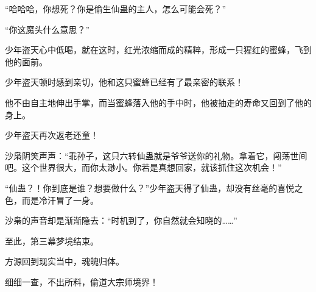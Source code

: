 \begin{this_body}
“哈哈哈，你想死？你是偷生仙蛊的主人，怎么可能会死？”

“你这魔头什么意思？”

少年盗天心中低喝，就在这时，红光浓缩而成的精粹，形成一只猩红的蜜蜂，飞到他的面前。

少年盗天顿时感到亲切，他和这只蜜蜂已经有了最亲密的联系！

他不由自主地伸出手掌，而当蜜蜂落入他的手中时，他被抽走的寿命又回到了他的身上。

少年盗天再次返老还童！

沙枭阴笑声声：“乖孙子，这只六转仙蛊就是爷爷送你的礼物。拿着它，闯荡世间吧。这个世界很大，而你太渺小。你若是真想回家，就该抓住这次机会！”

“仙蛊？！你到底是谁？想要做什么？”少年盗天得了仙蛊，却没有丝毫的喜悦之色，而是冷汗冒了一身。

沙枭的声音却是渐渐隐去：“时机到了，你自然就会知晓的……”

至此，第三幕梦境结束。

方源回到现实当中，魂魄归体。

细细一查，不出所料，偷道大宗师境界！

\end{this_body}

